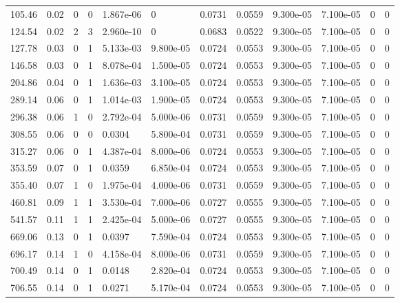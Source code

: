 \documentclass[preview]{standalone}
\begin{document}
{{\begin{tabular}{L{1.2cm}C{1.2cm} C{0.3cm}C{0.5cm} C{1.4cm}C{1.4cm} C{1.4cm}C{1.4cm} C{1.6cm}C{1.6cm} C{1.6cm}C{1.6cm}}
  105.46  &  0.02  & 0     &  0 &  1.867e-06  & 0  &  0.0731&   0.0559& 9.300e-05 & 7.100e-05   &  0 & 0  \\ 
  124.54  &  0.02  & 2     &  3 &  2.960e-10  & 0  &  0.0683&   0.0522& 9.300e-05 & 7.100e-05   &  0 & 0  \\ 
  127.78  &  0.03  & 0     &  1 &  5.133e-03  & 9.800e-05  &  0.0724&   0.0553& 9.300e-05 & 7.100e-05   &  0 & 0  \\ 
  146.58  &  0.03  & 0     &  1 &  8.078e-04  & 1.500e-05  &  0.0724&   0.0553& 9.300e-05 & 7.100e-05   &  0 & 0  \\ 
  204.86  &  0.04  & 0     &  1 &  1.636e-03  & 3.100e-05  &  0.0724&   0.0553& 9.300e-05 & 7.100e-05   &  0 & 0  \\ 
  289.14  &  0.06  & 0     &  1 &  1.014e-03  & 1.900e-05  &  0.0724&   0.0553& 9.300e-05 & 7.100e-05   &  0 & 0  \\ 
  296.38  &  0.06  & 1     &  0 &  2.792e-04  & 5.000e-06  &  0.0731&   0.0559& 9.300e-05 & 7.100e-05   &  0 & 0  \\ 
  308.55  &  0.06  & 0     &  0 &  0.0304  & 5.800e-04  &  0.0731&   0.0559& 9.300e-05 & 7.100e-05   &  0 & 0  \\ 
  315.27  &  0.06  & 0     &  1 &  4.387e-04  & 8.000e-06  &  0.0724&   0.0553& 9.300e-05 & 7.100e-05   &  0 & 0  \\ 
  353.59  &  0.07  & 0     &  1 &  0.0359  & 6.850e-04  &  0.0724&   0.0553& 9.300e-05 & 7.100e-05   &  0 & 0  \\ 
  355.40  &  0.07  & 1     &  0 &  1.975e-04  & 4.000e-06  &  0.0731&   0.0559& 9.300e-05 & 7.100e-05   &  0 & 0  \\ 
  460.81  &  0.09  & 1     &  1 &  3.530e-04  & 7.000e-06  &  0.0727&   0.0555& 9.300e-05 & 7.100e-05   &  0 & 0  \\ 
  541.57  &  0.11  & 1     &  1 &  2.425e-04  & 5.000e-06  &  0.0727&   0.0555& 9.300e-05 & 7.100e-05   &  0 & 0  \\ 
  669.06  &  0.13  & 0     &  1 &  0.0397  & 7.590e-04  &  0.0724&   0.0553& 9.300e-05 & 7.100e-05   &  0 & 0  \\ 
  696.17  &  0.14  & 1     &  0 &  4.158e-04  & 8.000e-06  &  0.0731&   0.0559& 9.300e-05 & 7.100e-05   &  0 & 0  \\ 
  700.49  &  0.14  & 0     &  1 &  0.0148  & 2.820e-04  &  0.0724&   0.0553& 9.300e-05 & 7.100e-05   &  0 & 0  \\ 
  706.55  &  0.14  & 0     &  1 &  0.0271  & 5.170e-04  &  0.0724&   0.0553& 9.300e-05 & 7.100e-05   &  0 & 0  \\ 

\end{tabular}}}
\end{document}
